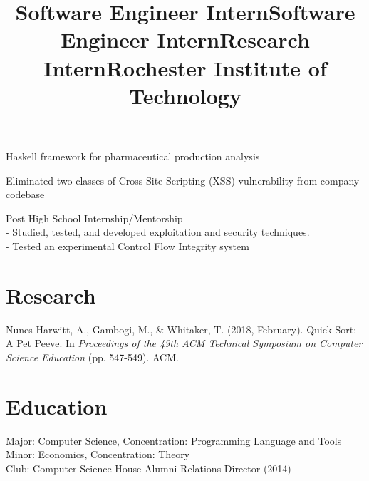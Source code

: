 \documentclass[line,margin,12pt]{resume}
\begin{document}
\begin{resume}
        \title{Software Engineer Intern}
        \begin{position}
            Haskell framework for pharmaceutical production analysis
        \end{position}

        \title{Software Engineer Intern}
        \begin{position}
            Eliminated two classes of Cross Site Scripting (XSS) vulnerability from company codebase
        \end{position}

        \title{Research Intern}
        \begin{position}
            Post High School Internship/Mentorship
            \\- Studied, tested, and developed exploitation and security techniques.
            \\- Tested an experimental Control Flow Integrity system
        \end{position}

        \section{Research}
        Nunes-Harwitt, A., Gambogi, M., \& Whitaker, T. (2018, February).
        Quick-Sort: A Pet Peeve.
        In \textit{Proceedings of the 49th ACM Technical Symposium on Computer Science Education} (pp. 547-549). ACM.

        \section{Education}
        \title{Rochester Institute of Technology}
        \begin{position}
            Major: Computer Science, Concentration: Programming Language and Tools \\
            Minor: Economics, Concentration: Theory \\
            Club: Computer Science House Alumni Relations Director (2014)
        \end{position}


    \end{resume}
    
\end{document}
